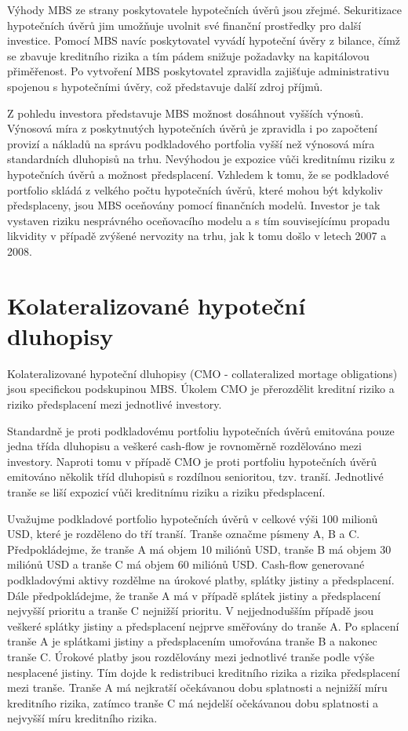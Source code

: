 \documentclass[a4paper]{book}
\begin{document}
Výhody MBS ze strany poskytovatele hypotečních úvěrů jsou zřejmé. Sekuritizace hypotečních úvěrů jim umožňuje uvolnit své finanční prostředky pro další investice. Pomocí MBS navíc poskytovatel vyvádí hypoteční úvěry z bilance, čímž se zbavuje kreditního rizika a tím pádem snižuje požadavky na kapitálovou přiměřenost. Po vytvoření MBS poskytovatel zpravidla zajišťuje administrativu spojenou s hypotečními úvěry, což představuje další zdroj příjmů.

Z pohledu investora představuje MBS možnost dosáhnout vyšších výnosů. Výnosová míra z poskytnutých hypotečních úvěrů je zpravidla i po započtení provizí a nákladů na správu podkladového portfolia vyšší než výnosová míra standardních dluhopisů na trhu. Nevýhodou je expozice vůči kreditnímu riziku z hypotečních úvěrů a možnost předsplacení. Vzhledem k tomu, že se podkladové portfolio skládá z velkého počtu hypotečních úvěrů, které mohou být kdykoliv předsplaceny, jsou MBS oceňovány pomocí finančních modelů. Investor je tak vystaven riziku nesprávného oceňovacího modelu a s tím souvisejícímu propadu likvidity v případě zvýšené nervozity na trhu, jak k tomu došlo v letech 2007 a 2008.

\section{Kolateralizované hypoteční dluhopisy}

Kolateralizované hypoteční dluhopisy (CMO - collateralized mortage obligations) jsou specifickou podskupinou MBS. Úkolem CMO je přerozdělit kreditní riziko a riziko předsplacení mezi jednotlivé investory.

Standardně je proti podkladovému portfoliu hypotečních úvěrů emitována pouze jedna třída dluhopisu a veškeré cash-flow je rovnoměrně rozdělováno mezi investory. Naproti tomu v případě CMO je proti portfoliu hypotečních úvěrů emitováno několik tříd dluhopisů s rozdílnou senioritou, tzv. tranší. Jednotlivé tranše se liší expozicí vůči kreditnímu riziku a riziku předsplacení.

Uvažujme podkladové portfolio hypotečních úvěrů v celkové výši 100 milionů USD, které je rozděleno do tří tranší. Tranše označme písmeny A, B a C. Předpokládejme, že tranše A má objem 10 miliónů USD, tranše B má objem 30 miliónů USD a tranše C má objem 60 miliónů USD. Cash-flow generované podkladovými aktivy rozdělme na úrokové platby, splátky jistiny a předsplacení. Dále předpokládejme, že tranše A má v případě splátek jistiny a předsplacení nejvyšší prioritu a tranše C nejnižší prioritu. V nejjednodušším případě jsou veškeré splátky jistiny a předsplacení nejprve směřovány do tranše A. Po splacení tranše A je splátkami jistiny a předsplacením umořována tranše B a nakonec tranše C. Úrokové platby jsou rozdělovány mezi jednotlivé tranše podle výše nesplacené jistiny. Tím dojde k redistribuci kreditního rizika a rizika předsplacení mezi tranše. Tranše A má nejkratší očekávanou dobu splatnosti a nejnižší míru kreditního rizika, zatímco tranše C má nejdelší očekávanou dobu splatnosti a nejvyšší míru kreditního rizika.
\end{document}
